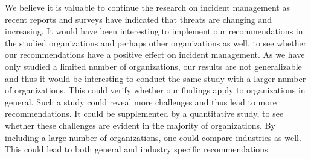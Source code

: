We believe it is valuable to continue the research on incident management as recent reports and surveys have indicated that threats are changing and increasing. It would have been interesting to implement our recommendations in the studied organizations and perhaps other organizations as well, to see whether our recommendations have a positive effect on incident management. As we have only studied a limited number of organizations, our results are not generalizable and thus it would be interesting to conduct the same study with a larger number of organizations. This could verify whether our findings apply to organizations in general. Such a study could reveal more challenges and thus lead to more recommendations. It could be supplemented by a quantitative study, to see whether these challenges are evident in the majority of organizations. By including a large number of organizations, one could compare industries as well. This could lead to both general and industry specific recommendations.
